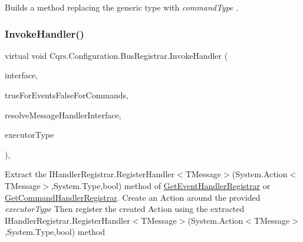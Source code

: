 Builds a method replacing the generic type with {\itshape command\+Type} . 

\mbox{\label{classCqrs_1_1Configuration_1_1BusRegistrar_a159eba5ece9015165be70676a52d8127_a159eba5ece9015165be70676a52d8127}} 
\subsubsection{\texorpdfstring{Invoke\+Handler()}{InvokeHandler()}}
{\footnotesize\ttfamily virtual void Cqrs.\+Configuration.\+Bus\+Registrar.\+Invoke\+Handler (\begin{DoxyParamCaption}\item[{Type @}]{interface,  }\item[{bool}]{true\+For\+Events\+False\+For\+Commands,  }\item[{Func$<$ Type, I\+Enumerable$<$ Type $>$$>$}]{resolve\+Message\+Handler\+Interface,  }\item[{Type}]{executor\+Type }\end{DoxyParamCaption})\hspace{0.3cm}{\ttfamily [protected]}, {\ttfamily [virtual]}}



Extract the I\+Handler\+Registrar.\+Register\+Handler$<$\+T\+Message$>$(\+System.\+Action$<$\+T\+Message$>$,\+System.\+Type,bool) method of \hyperlink{classCqrs_1_1Configuration_1_1BusRegistrar_adaab0236b3ce39214ce60b2272e5ab19_adaab0236b3ce39214ce60b2272e5ab19}{Get\+Event\+Handler\+Registrar} or \hyperlink{classCqrs_1_1Configuration_1_1BusRegistrar_a5ac56d73af9d550c70ee722daed7dce8_a5ac56d73af9d550c70ee722daed7dce8}{Get\+Command\+Handler\+Registrar}. Create an Action around the provided {\itshape executor\+Type}  Then register the created Action using the extracted I\+Handler\+Registrar.\+Register\+Handler$<$\+T\+Message$>$(\+System.\+Action$<$\+T\+Message$>$,\+System.\+Type,bool) method 


